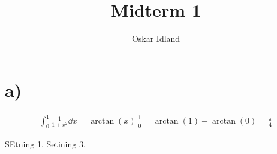 \documentclass{article}
\author{Oskar Idland}
\title{Midterm 1}
\date{}
\begin{document}
\maketitle
\section*{a)} %
\begin{align*}
    \int_{0}^{1} \frac{1}{1+x^2} \dd{x} = \arctan(x) \Big|_{0}^{1} = \arctan(1) - \arctan(0) = \frac{\pi}{4}
\end{align*}

SEtning 1. Setining 3.
\end{document}
